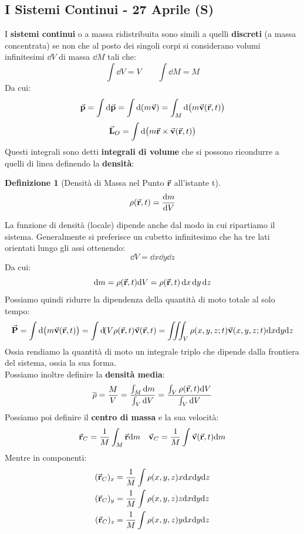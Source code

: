 \documentclass{article}
\newtheorem{defn}{Definizione}[section]
\newcommand{\note}{\noindent {\quad \bf \underline{Osservazione:}} \quad}
\renewcommand{\v}{\va{v}}
\renewcommand{\r}{\va{r}}
\newcommand{\p}{\va{p}}
\renewcommand{\P}{\va{P}}
\renewcommand{\L}{\va{L}}
\begin{document}
\subsection{I Sistemi Continui - 27 Aprile (S)}
I \textbf{sistemi continui} o a massa ridistribuita sono simili a quelli \textbf{discreti} (a massa concentrata) se non che al posto dei singoli corpi si considerano volumi infinitesimi $\dd V$ di massa $\dd M$ tali che:
\[\int\dd V=V\quad\quad\int\dd M=M\]
Da cui:
\[\p=\int\dd\p=\int\dd(m\v)=\int_M\dd(m\v(\r,t))\]
\[\L_O=\int\dd(m\r\times\v(\r,t))\]
Questi integrali sono detti \textbf{integrali di volume} che si possono ricondurre a quelli di linea definendo la \textbf{densità}:
\begin{defn}[Densità di Massa nel Punto $\r$ all'istante t]
\begin{equation}
    \rho(\r,t)=\dv{m}{V}
\end{equation}
\end{defn}
\note La funzione di densità (locale) dipende anche dal modo in cui ripartiamo il sistema. Generalmente si preferisce un cubetto infinitesimo che ha tre lati orientati lungo gli assi ottenendo:
\[\dd V=\dd x\dd y\dd z\]
Da cui:
\[\dd m=\rho(\r,t)\dd V=\rho(\r,t)\dif x\dif y\dif z\]
Possiamo quindi ridurre la dipendenza della quantità di moto totale al solo tempo:
\[\P=\int\dd(m\v(\r,t))=\int\dif(V\rho(\r,t)\v(\r,t)=\iiint_V\rho(x,y,z;t)\v(x,y,z;t)\dd x\dd y\dd z\]
Ossia rendiamo la quantità di moto un integrale triplo che dipende dalla frontiera del sistema, ossia la sua forma.\\
Possiamo inoltre definire la \textbf{densità media}:
\begin{equation}
    \overline{\rho}=\frac{M}{V}=\frac{\int_M\dd m}{\int_V\dd V}=\frac{\int_V\rho(\r,t)\dd V}{\int_V\dd V}
\end{equation}
Possiamo poi definire il \textbf{centro di massa} e la sua velocità:
\begin{equation}
    \r_C=\frac{1}{M}\int_M\r\dd m\quad\v_C=\frac{1}{M}\int\v(\r,t)\dd m
\end{equation}
Mentre in componenti:
\begin{align*}
    (\r_C)_x&=\frac{1}{M}\int\rho(x,y,z)x\dd x\dd y\dd z\\
    (\r_C)_y&=\frac{1}{M}\int\rho(x,y,z)z\dd x\dd y\dd z\\
    (\r_C)_z&=\frac{1}{M}\int\rho(x,y,z)y\dd x\dd y\dd z
\end{align*}
\end{document}
